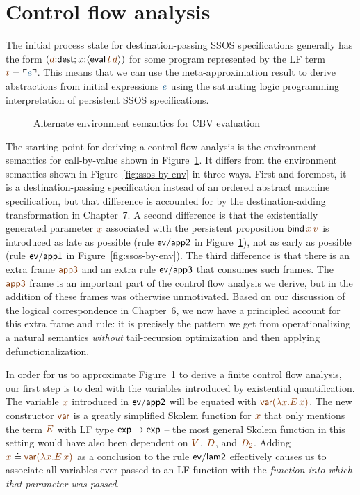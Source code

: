 \section{Control flow analysis}
\label{sec:0cfa}

The initial process state for destination-passing SSOS specifications
generally has the form 
$(\lf{d}{:}{\sf dest}; x{:}\susp{{\sf eval}\,\lf{t}\,\lf{d}})$
for some program represented by the LF term $\lf{t} = \interp{e}$. 
This means that we
can use the meta-approximation result to derive abstractions from
initial expressions $\obj{e}$ using the saturating logic programming
interpretation of persistent SSOS specifications.

\begin{figure}
\caption{Alternate environment semantics for CBV evaluation}
\label{fig:dest-env}
\end{figure}

The starting point for deriving a control flow analysis is the
environment semantics for call-by-value shown in
Figure~\ref{fig:dest-env}. It differs from the environment semantics
shown in Figure~\ref{fig:ssos-by-env} in three ways. First and
foremost, it is a destination-passing specification instead of an
ordered abstract machine specification, but that difference is
accounted for by the destination-adding transformation in Chapter~7.
A second difference is that the existentially generated parameter $\lf{x}$
associated with the persistent proposition ${\sf bind}\,\lf{x}\,\lf{v}$ is
introduced as late as possible (rule ${\sf ev/app2}$ in
Figure~\ref{fig:dest-env}), not as early as possible (rule ${\sf
  ev/app1}$ in Figure~\ref{fig:ssos-by-env}). The third difference is
that there is an extra frame $\lf{\sf app3}$ and an extra rule ${\sf
  ev/app3}$ that consumes such frames. The $\lf{\sf app3}$ frame is
an important part of the control flow analysis we derive, but in
\cite{simmons11logical} the addition of these frames was otherwise
unmotivated. Based on our discussion of the logical correspondence in
Chapter~6, we now have a principled account for this extra frame and
rule: it is precisely the pattern we get from operationalizing a
natural semantics {\it without} tail-recursion optimization and then
applying defunctionalization.

In order for us to approximate Figure~\ref{fig:dest-env} to derive a
finite control flow analysis, our first step is to deal with the
variables introduced by existential quantification. The variable $\lf{x}$
introduced in ${\sf ev/app2}$ will be equated with $\lf{{\sf var}(\lambda
x.E\,x)}$. The new constructor $\lf{\sf var}$ is a greatly simplified
Skolem function for $\lf{x}$ that only mentions the term $\lf{E}$ with LF type
${\sf exp} \rightarrow {\sf exp}$ -- the most general Skolem function
in this setting would have also been dependent on $\lf{V}$, $\lf{D}$, and
$\lf{D_2}$. Adding $\lf{x} \doteq \lf{{\sf var}(\lambda x.E\,x)}$ 
as a conclusion to
the rule ${\sf ev/lam2}$ effectively causes us to associate all
variables ever passed to an LF function with the {\it function into
  which that parameter was passed}.


